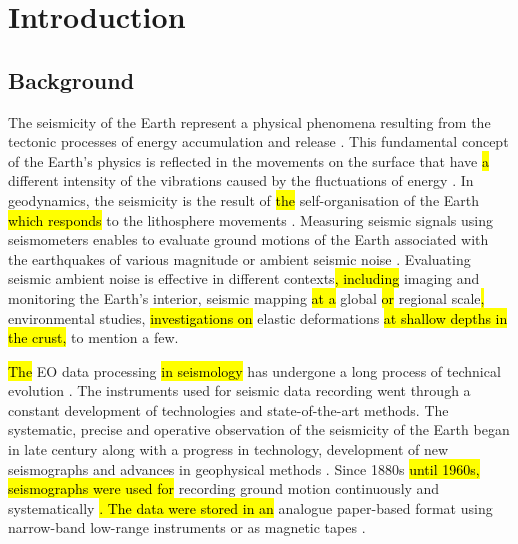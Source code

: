 \documentclass[sensors,article,submit,moreauthors,pdftex]{Definitions/mdpi}
\begin{document}

\section{Introduction}

\subsection{Background}
The seismicity of the Earth represent a physical phenomena resulting from the tectonic processes of energy accumulation and release \cite{GutenbergRichter}. This fundamental concept of the Earth's physics is reflected in the movements on the surface that have \hl{a }different intensity of the vibrations\hl{ }caused by the fluctuations of energy \cite{Shearer2019}. In geodynamics, the seismicity is the result of \hl{the }self-organisation of the Earth \hl{which responds }to the lithosphere movements \cite{UdiasBuforn2017}. Measuring seismic signals using seismometers enables to evaluate ground motions of the Earth\hl{ }associated with the earthquakes of various magnitude or ambient seismic noise \cite{nakata_gualtieri_fichtner_2019}. Evaluating seismic ambient noise is effective in different contexts\hl{, including }imaging and monitoring the Earth’s interior, seismic mapping \hl{at a }global \hl{or} regional scale\hl{, }environmental studies, \hl{investigations on }elastic deformations \hl{at shallow depths in the crust, } to mention a few.

\hl{The }\ac{EO} data processing \hl{in seismology }has undergone a long process of technical evolution \cite{DeweyByerly1979,Agnew}. The instruments used for seismic data recording went through a constant development of technologies and state-of-the-art methods. The systematic, precise and operative observation of the seismicity of the Earth began in late  century along with a progress in technology, development of new seismographs and \hl{ }advances in geophysical methods \cite{SchweitzerLee2003}. Since 1880s\hl{ until 1960s, seismographs were used for }recording ground motion continuously and systematically \cite{SchweitzerLee2003}\hl{. The data were stored in an }analogue paper-based format using\hl{ }narrow-band low-range instruments\hl{ }\cite{Batlloetal2008,Wangetal2014}\hl{ }or as magnetic tapes \cite{Anetal2015}. 
\end{document}
